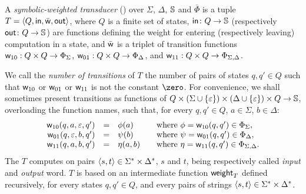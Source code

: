 \begin{definition}
\label{def:transducer} \label{def:SWT}
A \emph{symbolic-weighted transducer} (\SWT)
over $\Sigma$, $\Delta$, $\mathbb{S}$ and $\bar\Phi$
is a tuple
$T = \< Q, \init, \bar{\wei}, \final >$,
where $Q$ is a finite set of states,
$\mathsf{in} \colon Q \to \mathbb{S}$   %
(respectively $\mathsf{out} \colon Q \to \mathbb{S}$)  %
are functions defining the weight for entering
(respectively leaving) computation in a state,
and $\bar{\mathsf{w}}$ is a triplet of transition functions
$\mathsf{w}_{10}: Q \times Q \to \Phi_{\Sigma}$,
$\mathsf{w}_{01}: Q \times Q \to \Phi_{\Delta}$, and
$\mathsf{w}_{11}: Q \times Q \to \Phi_{\Sigma, \Delta}$.
\end{definition}
%
\noindent
We call the \emph{number of transitions} of $T$ the number of pairs of states
$q, q' \in Q$ such that $\mathsf{w}_{10}$ or $\mathsf{w}_{01}$ or $\mathsf{w}_{11}$
is not the constant $\zero$.
%
\noindent
For convenience, we shall sometimes present transitions
as functions of
$Q \times (\Sigma \cup \{ \varepsilon \}) \times (\Delta \cup \{ \varepsilon \}) \times Q \to \mathbb{S}$,
overloading the function names,
such that, for every $q, q' \in Q$, $a \in \Sigma$,  $b \in \Delta$:
\[
\begin{array}{rcll}
\wei_{10}(q, a, \varepsilon, q') & = & \phi(a) & %
\quad\mathrm{where~} \phi = \wei_{10}(q, q') \in \Phi_\Sigma,\\
\wei_{01}(q, \varepsilon, b, q') & = & \psi(b) &
\quad\mathrm{where~} \psi = \wei_{01}(q, q') \in \Phi_\Delta,\\
\wei_{11}(q, a, b, q') & = & \eta(a, b) &
\quad\mathrm{where~} \eta = \wei_{11}(q, q') \in \Phi_{\Sigma, \Delta}.\\
\end{array}
\]
%
\noindent
The \SWT $T$ computes on pairs $\< s, t> \in \Sigma^* \times \Delta^*$,
$s$ and $t$, being respectively called \emph{input} and \emph{output} word.
$T$ is
based on an intermediate function $\mathsf{weight}_T$
defined recursively, for every states $q, q' \in Q$,
and every pairs of strings $\< s, t> \in \Sigma^* \times \Delta^*$.
%
